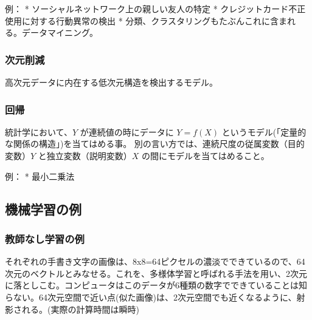 \documentclass[11pt]{article}
\begin{document}
例： * ソーシャルネットワーク上の親しい友人の特定 *
クレジットカード不正使用に対する行動異常の検出 *
分類、クラスタリングもたぶんこれに含まれる。データマイニング。

\subsubsection{次元削減}\label{ux6b21ux5143ux524aux6e1b}

高次元データに内在する低次元構造を検出するモデル。

\subsubsection{回帰}\label{ux56deux5e30}

統計学において、\(Y\) が連続値の時にデータに \(Y = f(X)\)
というモデル(「定量的な関係の構造」)を当てはめる事。
別の言い方では、連続尺度の従属変数（目的変数）\(Y\)
と独立変数（説明変数）\(X\) の間にモデルを当てはめること。

例： * 最小二乗法

    \subsection{機械学習の例}\label{ux6a5fux68b0ux5b66ux7fd2ux306eux4f8b}

\subsubsection{教師なし学習の例}\label{ux6559ux5e2bux306aux3057ux5b66ux7fd2ux306eux4f8b}

それぞれの手書き文字の画像は、8x8=64ピクセルの濃淡でできているので、64次元のベクトルとみなせる。これを、多様体学習と呼ばれる手法を用い、2次元に落としこむ。コンピュータはこのデータが6種類の数字でできていることは知らない。64次元空間で近い点(似た画像)は、2次元空間でも近くなるように、射影される。(実際の計算時間は瞬時)
\end{document}
